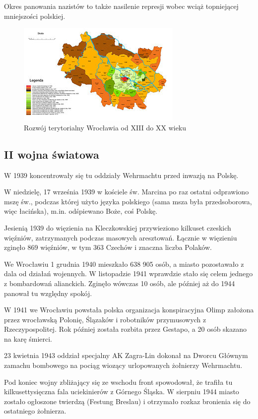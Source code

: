 \documentclass{article}
\begin{document}
Okres panowania nazistów to także nasilenie represji wobec wciąż topniejącej mniejszości polskiej.

\begin{figure}[htbp!!]
\centering
\includegraphics[scale=3.0]{11.jpg}
\caption{Rozwój terytorialny Wrocławia od XIII do XX wieku}
\label{fig:11}
\end{figure}

\subsection{II wojna światowa}

W 1939 koncentrowały się tu oddziały Wehrmachtu przed inwazją na Polskę.

W niedzielę, 17 września 1939 w kościele św. Marcina po raz ostatni odprawiono mszę św., podczas której użyto języka polskiego (sama msza była przedsoborowa, więc łacińska), m.in. odśpiewano Boże, coś Polskę.

Jesienią 1939 do więzienia na Kleczkowskiej przywieziono kilkuset czeskich więźniów, zatrzymanych podczas masowych aresztowań. Łącznie w więzieniu zginęło 869 więźniów, w tym 363 Czechów i znaczna liczba Polaków.

We Wrocławiu 1 grudnia 1940 mieszkało 638 905 osób, a miasto pozostawało z dala od działań wojennych. W listopadzie 1941 wprawdzie stało się celem jednego z bombardowań alianckich. Zginęło wówczas 10 osób, ale później aż do 1944 panował tu względny spokój.

W 1941 we Wrocławiu powstała polska organizacja konspiracyjna Olimp założona przez wrocławską Polonię, Ślązaków i robotników przymusowych z Rzeczypospolitej. Rok później została rozbita przez Gestapo, a 20 osób skazano na karę śmierci.

23 kwietnia 1943 oddział specjalny AK Zagra-Lin dokonał na Dworcu Głównym zamachu bombowego na pociąg wiozący urlopowanych żołnierzy Wehrmachtu.

Pod koniec wojny zbliżający się ze wschodu front spowodował, że trafiła tu kilkusettysięczna fala uciekinierów z Górnego Śląska. W sierpniu 1944 miasto zostało ogłoszone twierdzą (Festung Breslau) i otrzymało rozkaz bronienia się do ostatniego żołnierza.
\end{document}
